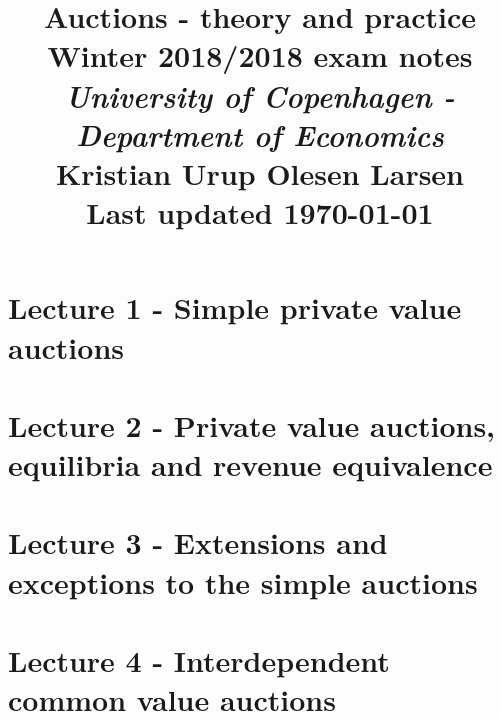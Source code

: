 \documentclass[12pt, a4paper]{article}
\theoremstyle{definition}
\begin{document}
\begin{spacing}{1.213}

\title{ Auctions - theory and practice  \\ \Large Winter 2018/2018 exam notes \\ \large \textit{University of Copenhagen - Department of Economics}  \\
\normalsize Kristian Urup Olesen Larsen \\
\normalsize Last updated \today  } %
\date{} %
\maketitle %
\setcounter{page}{1} %


\pagebreak

\tableofcontents
\newpage

\section{Lecture 1 - Simple private value auctions}


\section{Lecture 2 - Private value auctions, equilibria and revenue equivalence}


\section{Lecture 3 - Extensions and exceptions to the simple auctions}


\section{Lecture 4 - Interdependent common value auctions}


\end{spacing}
\end{document}
